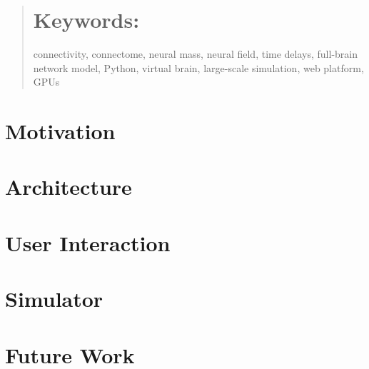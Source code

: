 \begin{abstract}
  
\section{Keywords:} connectivity, connectome, neural mass, neural field, 
time delays, full-brain network model, Python, virtual brain, large-scale 
simulation,  web platform, GPUs
\end{abstract}

\section{Motivation}


\section{Architecture}


\section{User Interaction}


\section{Simulator}


\section{Future Work}







